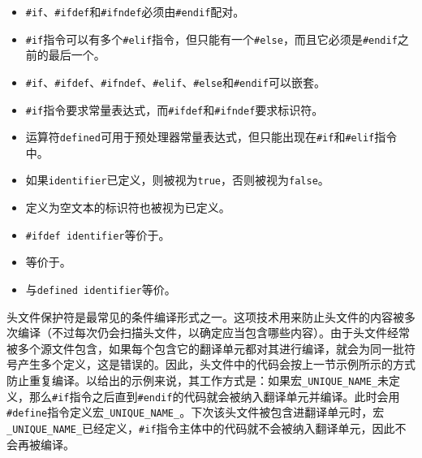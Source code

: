 \begin{itemize}
\item \texttt{\#if}、\texttt{\#ifdef}和\texttt{\#ifndef}必须由\texttt{\#endif}配对。



\item \texttt{\#if}指令可以有多个\texttt{\#elif}指令，但只能有一个\texttt{\#else}，而且它必须是\texttt{\#endif}之前的最后一个。



\item \texttt{\#if}、\texttt{\#ifdef}、\texttt{\#ifndef}、\texttt{\#elif}、\texttt{\#else}和\texttt{\#endif}可以嵌套。



\item \texttt{\#if}指令要求常量表达式，而\texttt{\#ifdef}和\texttt{\#ifndef}要求标识符。



\item 运算符\texttt{defined}可用于预处理器常量表达式，但只能出现在\texttt{\#if}和\texttt{\#elif}指令中。



\item 如果\texttt{identifier}已定义，则被视为\texttt{true}，否则被视为\texttt{false}。



\item 定义为空文本的标识符也被视为已定义。



\item \texttt{\#ifdef identifier}等价于。



\item {}等价于。



\item {}与\texttt{defined identifier}等价。

\end{itemize}



头文件保护符是最常见的条件编译形式之一。这项技术用来防止头文件的内容被多次编译（不过每次仍会扫描头文件，以确定应当包含哪些内容）。由于头文件经常被多个源文件包含，如果每个包含它的翻译单元都对其进行编译，就会为同一批符号产生多个定义，这是错误的。因此，头文件中的代码会按上一节示例所示的方式防止重复编译。以给出的示例来说，其工作方式是：如果宏\texttt{\_\allowbreak{}UNIQUE\_\allowbreak{}NAME\_}未定义，那么\texttt{\#if}指令之后直到\texttt{\#endif}的代码就会被纳入翻译单元并编译。此时会用\texttt{\#define}指令定义宏\texttt{\_\allowbreak{}UNIQUE\_\allowbreak{}NAME\_}。下次该头文件被包含进翻译单元时，宏\texttt{\_\allowbreak{}UNIQUE\_\allowbreak{}NAME\_}已经定义，\texttt{\#if}指令主体中的代码就不会被纳入翻译单元，因此不会再被编译。


